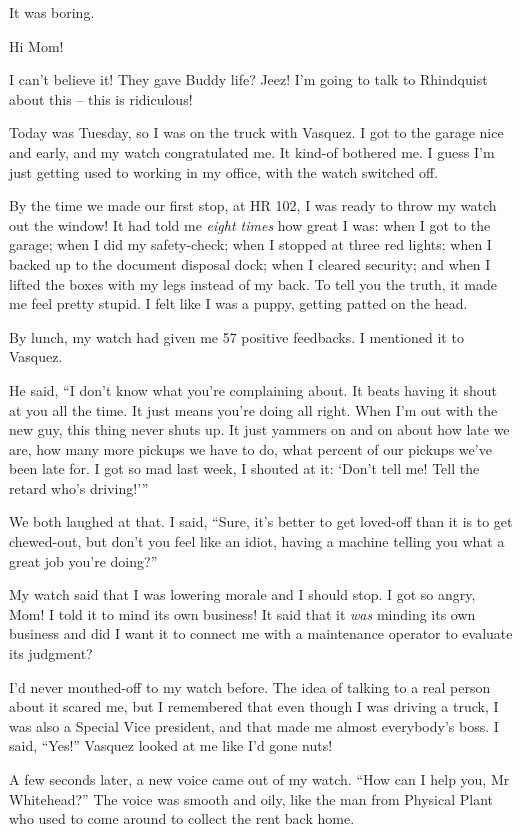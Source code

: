 It was boring.

\tb

Hi Mom!

I can't believe it! They gave Buddy life? Jeez! I'm going to talk to 
Rhindquist about this -- this is ridiculous!

Today was Tuesday, so I was on the truck with Vasquez. I got to the 
garage nice and early, and my watch congratulated me. It kind-of 
bothered me. I guess I'm just getting used to working in my office, 
with the watch switched off.

By the time we made our first stop, at HR 102, I was ready to throw my 
watch out the window! It had told me \emph{eight times} how great I 
was: when I got to the garage; when I did my safety-check; when I 
stopped at three red lights; when I backed up to the document disposal 
dock; when I cleared security; and when I lifted the boxes with my legs 
instead of my back. To tell you the truth, it made me feel pretty 
stupid. I felt like I was a puppy, getting patted on the head.

By lunch, my watch had given me 57 positive feedbacks. I mentioned it 
to Vasquez.

He said, “I don't know what you're complaining about. It beats having 
it shout at you all the time. It just means you're doing all right. 
When I'm out with the new guy, this thing never shuts up. It just 
yammers on and on about how late we are, how many more pickups we have 
to do, what percent of our pickups we've been late for. I got so mad 
last week, I shouted at it: `Don't tell me! Tell the retard who's 
driving!'”

We both laughed at that. I said, “Sure, it's better to get loved-off 
than it is to get chewed-out, but don't you feel like an idiot, having 
a machine telling you what a great job you're doing?”

My watch said that I was lowering morale and I should stop. I got so 
angry, Mom! I told it to mind its own business! It said that it 
\emph{was} minding its own business and did I want it to connect me 
with a maintenance operator to evaluate its judgment?

I'd never mouthed-off to my watch before. The idea of talking to a real 
person about it scared me, but I remembered that even though I was 
driving a truck, I was also a Special Vice president, and that made me 
almost everybody's boss. I said, “Yes!” Vasquez looked at me like 
I'd gone nuts!

A few seconds later, a new voice came out of my watch. “How can I 
help you, Mr Whitehead?” The voice was smooth and oily, like the man 
from Physical Plant who used to come around to collect the rent back 
home.

